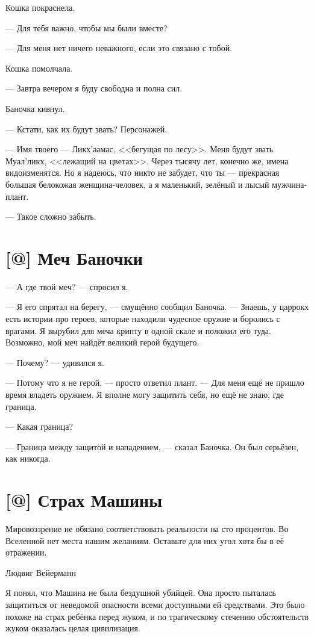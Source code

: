 Кошка покраснела.

--- Для тебя важно, чтобы мы были вместе?

--- Для меня нет ничего неважного, если это связано с тобой.

Кошка помолчала.

--- Завтра вечером я буду свободна и полна сил.

Баночка кивнул.

--- Кстати, как их будут звать?
Персонажей.

--- Имя твоего --- Ликх'аамас, <<бегущая по лесу>>.
Меня будут звать Муал'ликх, <<лежащий на цветах>>.
Через тысячу лет, конечно же, имена видоизменятся.
Но я надеюсь, что никто не забудет, что ты --- прекрасная большая белокожая женщина-человек, а я маленький, зелёный и лысый мужчина-плант.

--- Такое сложно забыть.

\section{[@] Меч Баночки}

--- А где твой меч? --- спросил я.

--- Я его спрятал на берегу, --- смущённо сообщил Баночка.
--- Знаешь, у царрокх есть истории про героев, которые находили чудесное оружие и боролись с врагами.
Я вырубил для меча крипту в одной скале и положил его туда.
Возможно, мой меч найдёт великий герой будущего.

--- Почему? --- удивился я.

--- Потому что я не герой, --- просто ответил плант.
--- Для меня ещё не пришло время владеть оружием.
Я вполне могу защитить себя, но ещё не знаю, где граница.

--- Какая граница?

--- Граница между защитой и нападением, --- сказал Баночка.
Он был серьёзен, как никогда.

\section{[@] Страх Машины}

\epigraph
{Мировоззрение не обязано соответствовать реальности на сто процентов.
Во Вселенной нет места нашим желаниям.
Оставьте для них угол хотя бы в её отражении.}
{Людвиг Вейерманн}

\textspace

Я понял, что Машина не была бездушной убийцей.
Она просто пыталась защититься от неведомой опасности всеми доступными ей средствами.
Это было похоже на страх ребёнка перед жуком, и по трагическому стечению обстоятельств жуком оказалась целая цивилизация.

